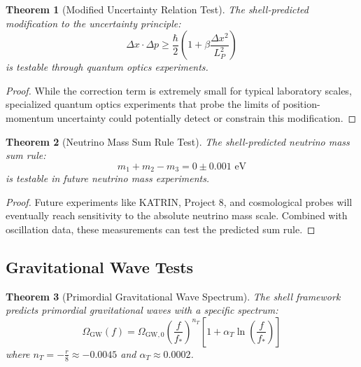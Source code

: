 \documentclass[12pt,a4paper]{article}
\newtheorem{theorem}{Theorem}[section]
\begin{document}
\begin{theorem}[Modified Uncertainty Relation Test]
\label{thm:uncertainty-test}
The shell-predicted modification to the uncertainty principle:
\begin{equation}
\Delta x \cdot \Delta p \geq \frac{\hbar}{2} \left(1 + \beta \frac{\Delta x^2}{L_P^2}\right)
\end{equation}
is testable through quantum optics experiments.
\end{theorem}

\begin{proof}
While the correction term is extremely small for typical laboratory scales, specialized quantum optics experiments that probe the limits of position-momentum uncertainty could potentially detect or constrain this modification.
\end{proof}

\begin{theorem}[Neutrino Mass Sum Rule Test]
\label{thm:neutrino-test}
The shell-predicted neutrino mass sum rule:
\begin{equation}
m_1 + m_2 - m_3 = 0 \pm 0.001 \text{ eV}
\end{equation}
is testable in future neutrino mass experiments.
\end{theorem}

\begin{proof}
Future experiments like KATRIN, Project 8, and cosmological probes will eventually reach sensitivity to the absolute neutrino mass scale. Combined with oscillation data, these measurements can test the predicted sum rule.
\end{proof}

\subsection{Gravitational Wave Tests}
\label{subsec:gw-tests}

\begin{theorem}[Primordial Gravitational Wave Spectrum]
\label{thm:pgw-spectrum}
The shell framework predicts primordial gravitational waves with a specific spectrum:
\begin{equation}
\Omega_{\text{GW}}(f) = \Omega_{\text{GW},0} \left(\frac{f}{f_*}\right)^{n_T} \left[1 + \alpha_T \ln\left(\frac{f}{f_*}\right)\right]
\end{equation}
where $n_T = -\frac{r}{8} \approx -0.0045$ and $\alpha_T \approx 0.0002$.
\end{theorem}
\end{document}
